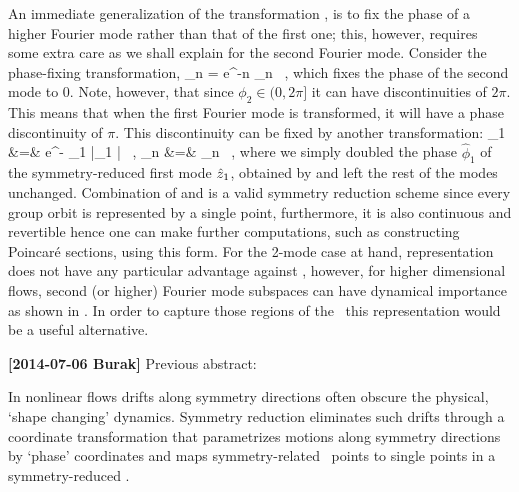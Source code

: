 An immediate generalization of the transformation ,
is to fix the phase of a higher Fourier mode rather than that of the first one; this, however, requires
some extra care as we shall explain for the second Fourier mode.
Consider the phase-fixing transformation,
\beq
	\sspRedC_n = e^{-\ii n } \sspC_n \, ,
	\label{e-2ndmodeTransform}
\eeq
which fixes the phase of the second mode to $0$. Note, however, that since
$\phi_2 \in (0, 2 \pi]$ it can have discontinuities of $2 \pi$. This means
that when the first Fourier mode is transformed, it will have a phase discontinuity
of $\pi$. This discontinuity can be fixed by another
transformation:
\bea
	\tilde{\sspC}_1 &=& e^{- \hat{\phi}_1} |\sspRedC_1 | \, , \continue
	\tilde{\sspC}_{n } &=& \sspRedC_n \, ,
	\label{e-PhaseDoubling}
\eea
where we simply doubled the phase $\hat{\phi}_1$ of the symmetry-reduced
first mode $\hat{z}_1$, obtained by  and left
the rest of the modes unchanged. Combination of 
and  is a valid symmetry reduction scheme since every
group orbit is represented by a single point, furthermore, it is also continuous
and revertible hence one can make further computations, such as constructing
Poincar\'{e} sections, using this form. For the 2-mode case at hand, representation
 does not have any particular advantage against
, however, for higher dimensional flows, second
(or higher) Fourier mode subspaces can have dynamical importance as shown in
. In order to capture those regions of the \statesp\ this
representation would be a useful alternative.

{\bf[2014-07-06 Burak]} Previous abstract:

In nonlinear flows drifts along symmetry directions often obscure the
physical, `shape changing' dynamics. Symmetry reduction eliminates such
drifts through a coordinate transformation that parametrizes motions along
symmetry directions by `phase' coordinates and maps symmetry-related \statesp\ points
to single points in a symmetry-reduced \statesp.

